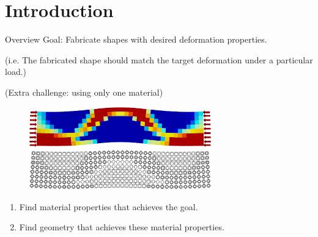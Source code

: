\section{Introduction}
\begin{frame}{Overview}
Goal: Fabricate shapes with desired deformation properties.

(i.e. The fabricated shape should match the target deformation under a particular
load.)

(Extra challenge: using only one material)
\end{frame}

\begin{frame}
\begin{figure}
\includegraphics[width=0.7\textwidth]{Images/material_opt_bump_half.png}

\vspace{3mm}
\includegraphics[width=0.7\textwidth]{Images/microstructure_bump_half_box.png}
\end{figure}

\begin{enumerate}
\item Find material properties that achieves the goal.
\item Find geometry that achieves these material properties.
\end{enumerate}
\end{frame}
